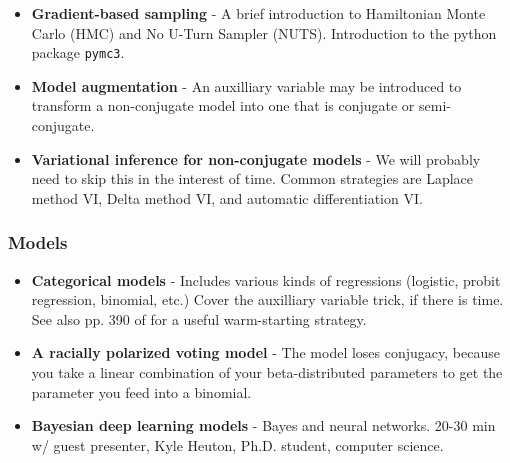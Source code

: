 \documentclass{article} %
\begin{document}
\begin{itemize}
	\item \textbf{Gradient-based sampling} - A brief introduction to Hamiltonian Monte Carlo (HMC) and No U-Turn Sampler (NUTS).  Introduction to the python package \texttt{pymc3}.
	\item \textbf{Model augmentation} - An auxilliary variable may be introduced to transform a non-conjugate model into one that is conjugate or semi-conjugate.
	\item \textbf{Variational inference for non-conjugate models} - We will probably need to skip this in the interest of time.  Common strategies are Laplace method VI,  Delta method VI, and automatic differentiation VI.
\end{itemize}
\subsubsection{Models}

\begin{itemize}
\item \textbf{Categorical models} - Includes various kinds of regressions (logistic, probit regression,  binomial,  etc.)  Cover the auxilliary variable trick, if there is time. See also pp.  390 of \cite{hoff2009first} for a useful warm-starting strategy.
\item \textbf{A racially polarized voting model} - The model loses conjugacy, because you take a linear combination of your beta-distributed parameters to get the parameter you feed into a binomial.
\item \textbf{Bayesian deep learning models} -  Bayes and neural networks.   20-30 min w/ guest presenter,  Kyle Heuton,  Ph.D.  student,  computer science.
\end{itemize}
\end{document}
